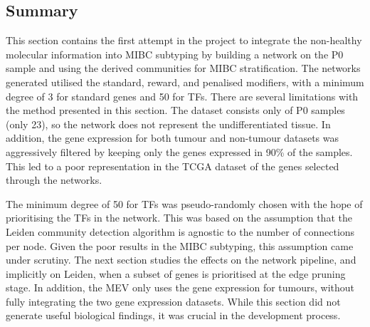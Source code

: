 \subsection{Summary}

This section contains the first attempt in the project to integrate the non-healthy molecular information into MIBC subtyping by building a network on the P0 sample and using the derived communities for MIBC stratification. The networks generated utilised the standard, reward, and penalised modifiers, with a minimum degree of 3 for standard genes and 50 for TFs. There are several limitations with the method presented in this section. The dataset consists only of P0 samples (only 23), so the network does not represent the undifferentiated tissue. In addition, the gene expression for both tumour and non-tumour datasets was aggressively filtered by keeping only the genes expressed in 90\% of the samples. This led to a poor representation in the TCGA dataset of the genes selected through the networks.

The minimum degree of 50 for TFs was pseudo-randomly chosen with the hope of prioritising the TFs in the network. This was based on the assumption that the Leiden community detection algorithm is agnostic to the number of connections per node. Given the poor results in the MIBC subtyping, this assumption came under scrutiny. The next section studies the effects on the network pipeline, and implicitly on Leiden, when a subset of genes is prioritised at the edge pruning stage. In addition, the MEV only uses the gene expression for tumours, without fully integrating the two gene expression datasets. While this section did not generate useful biological findings, it was crucial in the development process.




